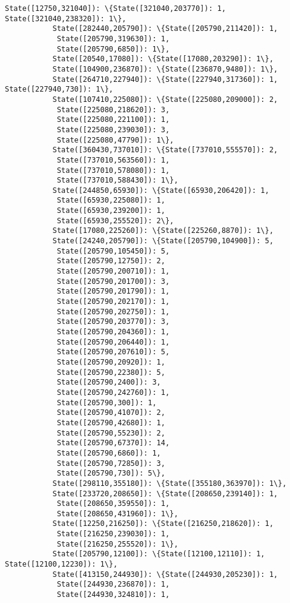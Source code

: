 \documentclass[11pt]{article}
\begin{document}
\begin{Verbatim}[commandchars=\\\{\}]
           State([12750,321040]): \{State([321040,203770]): 1, State([321040,238320]): 1\},
           State([282440,205790]): \{State([205790,211420]): 1,
            State([205790,319630]): 1,
            State([205790,6850]): 1\},
           State([20540,17080]): \{State([17080,203290]): 1\},
           State([104900,236870]): \{State([236870,9480]): 1\},
           State([264710,227940]): \{State([227940,317360]): 1, State([227940,730]): 1\},
           State([107410,225080]): \{State([225080,209000]): 2,
            State([225080,218620]): 3,
            State([225080,221100]): 1,
            State([225080,239030]): 3,
            State([225080,47790]): 1\},
           State([360430,737010]): \{State([737010,555570]): 2,
            State([737010,563560]): 1,
            State([737010,578080]): 1,
            State([737010,588430]): 1\},
           State([244850,65930]): \{State([65930,206420]): 1,
            State([65930,225080]): 1,
            State([65930,239200]): 1,
            State([65930,255520]): 2\},
           State([17080,225260]): \{State([225260,8870]): 1\},
           State([24240,205790]): \{State([205790,104900]): 5,
            State([205790,105450]): 5,
            State([205790,12750]): 2,
            State([205790,200710]): 1,
            State([205790,201700]): 3,
            State([205790,201790]): 1,
            State([205790,202170]): 1,
            State([205790,202750]): 1,
            State([205790,203770]): 3,
            State([205790,204360]): 1,
            State([205790,206440]): 1,
            State([205790,207610]): 5,
            State([205790,20920]): 1,
            State([205790,22380]): 5,
            State([205790,2400]): 3,
            State([205790,242760]): 1,
            State([205790,300]): 1,
            State([205790,41070]): 2,
            State([205790,42680]): 1,
            State([205790,55230]): 2,
            State([205790,67370]): 14,
            State([205790,6860]): 1,
            State([205790,72850]): 3,
            State([205790,730]): 5\},
           State([298110,355180]): \{State([355180,363970]): 1\},
           State([233720,208650]): \{State([208650,239140]): 1,
            State([208650,359550]): 1,
            State([208650,431960]): 1\},
           State([12250,216250]): \{State([216250,218620]): 1,
            State([216250,239030]): 1,
            State([216250,255520]): 1\},
           State([205790,12100]): \{State([12100,12110]): 1, State([12100,12230]): 1\},
           State([413150,244930]): \{State([244930,205230]): 1,
            State([244930,236870]): 1,
            State([244930,324810]): 1,

\end{Verbatim}
\end{document}
